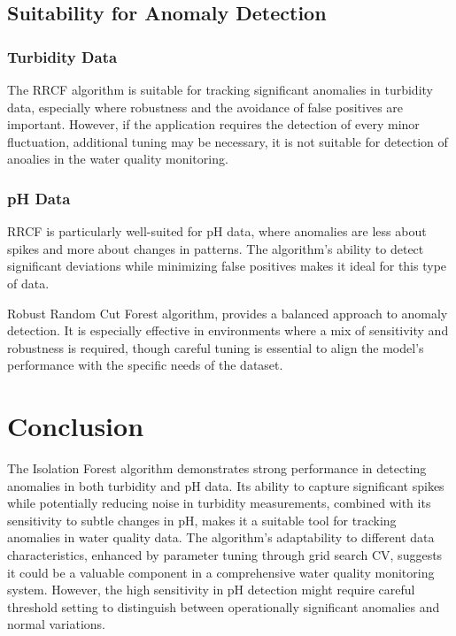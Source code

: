 \documentclass[12pt]{report}
\begin{document}
\subsection{Suitability for Anomaly Detection}

\subsubsection{Turbidity Data}
The RRCF algorithm is suitable for tracking significant anomalies in turbidity data, especially where robustness and the avoidance of false positives are important. However, if the application requires the detection of every minor fluctuation, additional tuning may be necessary, it  is  not  suitable  for detection of  anoalies in the  water quality  monitoring.

\subsubsection{pH Data}
RRCF is particularly well-suited for pH data, where anomalies are less about spikes and more about changes in patterns. The algorithm’s ability to detect significant deviations while minimizing false positives makes it ideal for this type of data.
\par
Robust Random Cut Forest algorithm, provides a balanced approach to anomaly detection. It is especially effective in environments where a mix of sensitivity and robustness is required, though careful tuning is essential to align the model’s performance with the specific needs of the dataset.



\section*{Conclusion}
The Isolation Forest algorithm demonstrates strong performance in detecting anomalies in both turbidity and pH data. Its ability to capture significant spikes while potentially reducing noise in turbidity measurements, combined with its sensitivity to subtle changes in pH, makes it a suitable tool for tracking anomalies in water quality data. The algorithm's adaptability to different data characteristics, enhanced by parameter tuning through grid search CV, suggests it could be a valuable component in a comprehensive water quality monitoring system. However, the high sensitivity in pH detection might require careful threshold setting to distinguish between operationally significant anomalies and normal variations.
\end{document}
